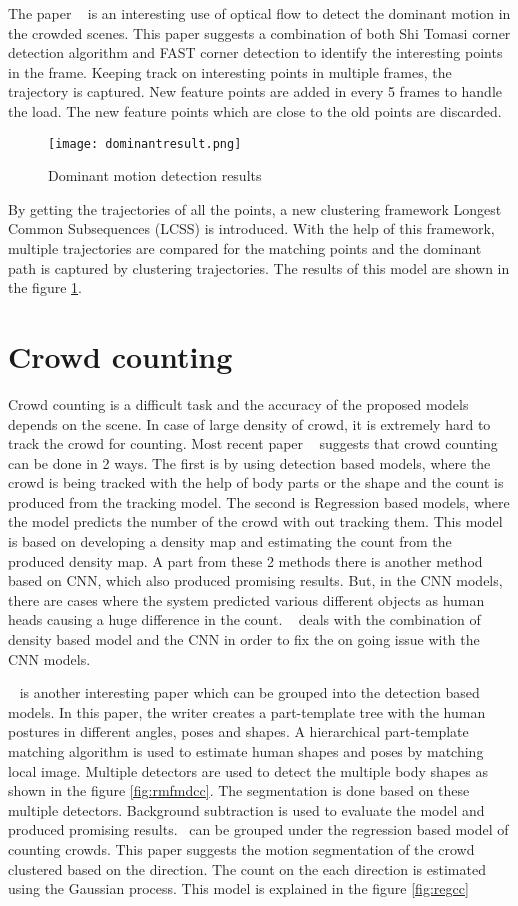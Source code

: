 The paper ~\cite{cheriyadat2008detecting} is an interesting use of optical flow to detect the dominant motion in the crowded scenes. This paper suggests a combination of both Shi Tomasi corner detection algorithm and FAST corner detection to identify the  interesting points in the frame. Keeping track on interesting points in multiple frames, the trajectory is captured. New feature points are added in every 5 frames to handle the load. The new feature points which are close to the old points are discarded. 
\begin{figure}[tb]
	\center\texttt{[image: dominantresult.png]}
	\caption{Dominant motion detection results}
	\label{fig:dominantresult}
\end{figure}
By getting the trajectories of all the points, a new clustering framework Longest Common Subsequences (LCSS) is introduced. With the help of this framework, multiple trajectories are compared for the matching points and the dominant path is captured by clustering trajectories. The results of this model are shown in the figure \ref{fig:dominantresult}.

\section{Crowd counting}
Crowd counting is a difficult task and the accuracy of the proposed models depends on the scene. In case of large density of crowd, it is extremely hard to track the crowd for counting. Most recent paper ~\cite{chen2020crowd} suggests that crowd counting can be done in 2 ways. The first is by using detection based models, where the crowd is being tracked with the help of body parts or the shape and the count is produced from the tracking model. The second is Regression based models, where the model predicts the number of the crowd with out tracking them. This model is based on developing a density map and estimating the count from the produced density map. A part from these 2 methods there is another method based on CNN, which also produced promising results. But, in the CNN models, there are cases where the system predicted various different objects as human heads causing a huge difference in the count.  ~\cite{chen2020crowd} deals with the combination of density based model and the CNN in order to fix the on going issue with the CNN models.

~\cite{5374413} is another interesting paper which can be grouped into the detection based models. In this paper, the writer creates a part-template tree with the human postures in different angles, poses and shapes. A hierarchical part-template matching algorithm is used to estimate human shapes and poses by matching local image. Multiple detectors are used to detect the multiple body shapes as shown in the figure \ref{fig:rmfmdcc}. The segmentation is done based on these multiple detectors. Background subtraction is used to evaluate the model and produced promising results.~\cite{chan2008privacy} can be grouped under the regression based model of counting crowds. This paper suggests the motion segmentation of the crowd clustered based on the direction. The count on the each direction is estimated using the Gaussian process. This model is explained in the figure \ref{fig:regcc}

